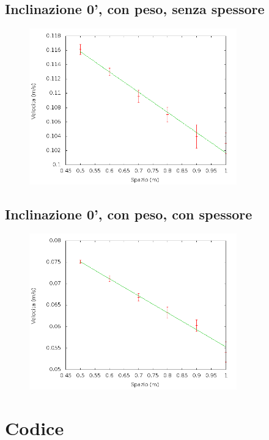 \documentclass[12pt]{article} %
\begin{document}
	\subsection {Inclinazione 0', con peso, senza spessore}
		\begin{figure}[H]
		\centering
		\includegraphics[width=0.8\textwidth]{velocita_0gradi_peso}
		\label{fig:0p}
	\end{figure}
 
	\subsection {Inclinazione 0', con peso, con spessore}
		\begin{figure}[H]
		\centering
		\includegraphics[width=0.8\textwidth]{velocita_0gradi_pesoalluminio}
		\label{fig:0ap}
	\end{figure}
 

\newpage
\section{Codice}
\end{document}
